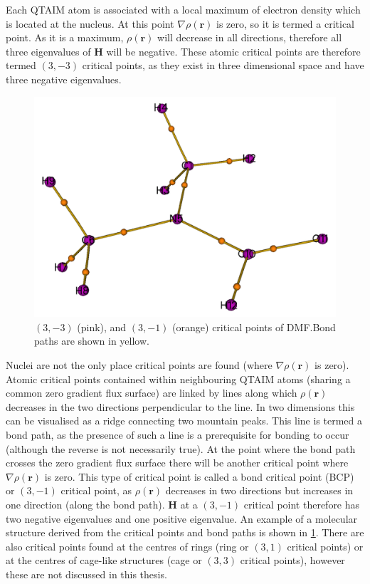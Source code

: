 \begin{refsection}
Each QTAIM atom is associated with a local maximum of electron density which is located at the nucleus.
At this point $ \nabla\rho(\textbf{r}) $ is zero, so it is termed a critical point.
As it is a maximum, $ \rho(\textbf{r}) $ will decrease in all directions, therefore all three eigenvalues of $ \mathbf{H} $ will be negative.
These atomic critical points are therefore termed $ (3,-3) $ critical points, as they exist in three dimensional space and have three negative eigenvalues.

\begin{figure}
    \includegraphics[width=0.45\linewidth]{Figures/dmf-cp.pdf}
    \caption[Critical points of DMF.]{$(3,-3)$ (pink), and $(3,-1)$ (orange) critical points of DMF.\@ Bond paths are shown in yellow.}\label{fig:dmf-cps}
\end{figure}

Nuclei are not the only place critical points are found (where $ \nabla\rho(\textbf{r}) $ is zero).
Atomic critical points contained within neighbouring QTAIM atoms (sharing a common zero gradient flux surface) are linked by lines along which $ \rho(\textbf{r}) $ decreases in the two directions perpendicular to the line.
In two dimensions this can be visualised as a ridge connecting two mountain peaks.
This line is termed a bond path, as the presence of such a line is a prerequisite for bonding to occur (although the reverse is not necessarily true).
At the point where the bond path crosses the zero gradient flux surface there will be another critical point where $ \nabla\rho(\textbf{r}) $ is zero.
This type of critical point is called a bond critical point (BCP) or $ (3,-1) $ critical point, as $ \rho(\textbf{r}) $ decreases in two directions but increases in one direction (along the bond path).
$ \mathbf{H} $ at a $ (3,-1) $ critical point therefore has two negative eigenvalues and one positive eigenvalue.
An example of a molecular structure derived from the critical points and bond paths is shown in \cref{fig:dmf-cps}.
There are also critical points found at the centres of rings (ring or $ (3,1) $ critical points) or at the centres of cage-like structures (cage or $ (3,3) $ critical points), however these are not discussed in this thesis.


\end{refsection}
